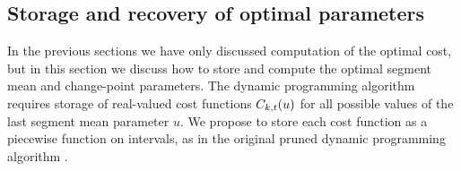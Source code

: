 \documentclass{article}
\begin{document}

\subsection{Storage and recovery of optimal parameters}
\label{sec:decoding}
In the previous sections we have only discussed computation of the
optimal cost, but in this section we discuss how to store and compute
the optimal segment mean and change-point parameters. The dynamic
programming algorithm requires storage of real-valued cost functions
$C_{k,t}(u)$ for all possible values of the last segment mean
parameter $u$. We propose to store each cost function as a piecewise
function on intervals, as in the original pruned dynamic programming
algorithm \citep{pruned-dp}.
\end{document}
